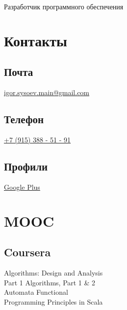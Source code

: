 \documentclass[a4paper]{curricula-vitae}
\begin{document}


{Разработчик программного обеспечения}

\begin{minipage}[t]{0.33\textwidth}%

\section{Контакты} 

\subsection{Почта}
\href{mailto:igor.sysoev.main@gmail.com}{igor.sysoev.main@gmail.com}

\insertspace

\subsection{Телефон}
\href{tel:+79153885191}{+7 (915) 388 - 51 - 91}

\insertspace

\subsection{Профили}
\href{https://plus.google.com/+%D0%98%D0%B3%D0%BE%D1%80%D1%8C%D0%A1%D1%8B%D1%81%D0%BE%D0%B5%D0%B2}{Google Plus}

\insertspace

\section{MOOC}

\subsection{Coursera}
Algorithms: Design and Analysis \\
Part 1 \textbullet{} Algorithms, Part 1 \& 2 \\ 
Automata \textbullet{} Functional \\
Programming Principles in Scala


\end{minipage}
\end{document}
